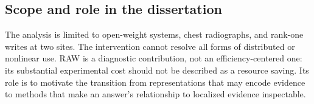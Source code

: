 \subsection{Scope and role in the dissertation}
The analysis is limited to open-weight systems, chest radiographs, and rank-one writes at two sites. The intervention cannot resolve all forms of distributed or nonlinear use. RAW is a diagnostic contribution, not an efficiency-centered one: its substantial experimental cost should not be described as a resource saving. Its role is to motivate the transition from representations that may encode evidence to methods that make an answer's relationship to localized evidence inspectable.

